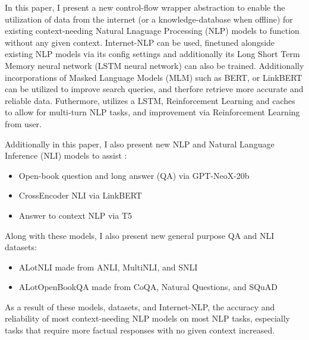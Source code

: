 

In this paper, I present {\bf \inlp} a new control-flow wrapper abstraction to enable the utilization of data from the internet (or a knowledge-database when offline) for existing context-needing Natural Lnaguage Processing (NLP) models to function without any given context. Internet-NLP can be used, finetuned alongside existing NLP models via its config settings and additionally its Long Short Term Memory neural network (LSTM neural network) can also be trained. Additionally incorporations of Masked Language Models (MLM) such as BERT, or LinkBERT \cite{devlin-etal-2019-bert,yasunaga-etal-2022-linkbert} can be utilized to improve search queries, and therfore retrieve more accurate and reliable data. Futhermore, {\bf \inlp} utilizes a LSTM, Reinforcement Learning and caches to allow for multi-turn NLP tasks, and improvement via Reinforcement Learning from user.


Additionally in this paper, I also present new NLP and Natural Language Inference (NLI) models to assist {\bf \inlp}:

\begin{itemize}
    \item Open-book question and long answer (QA) via GPT-NeoX-20b \cite{gpt-neox-library, gpt-neox-20b}
    \item CrossEncoder NLI via LinkBERT \cite{reimers-2019-sentence-bert,thakur-2020-AugSBERT, yasunaga-etal-2022-linkbert}
    \item Answer to context NLP via T5 \cite{https://doi.org/10.48550/arxiv.1910.10683}
\end{itemize}

Along with these models, I also present new general purpose QA and NLI datasets:

\begin{itemize}
    \item ALotNLI made from ANLI, MultiNLI, and SNLI \cite{nie-etal-2020-adversarial,N18-1101,DBLP:journals/corr/BowmanAPM15}
    \item ALotOpenBookQA made from CoQA, Natural Questions, and SQuAD \cite{DBLP:journals/corr/abs-1808-07042,kwiatkowski-etal-2019-natural,DBLP:journals/corr/abs-1806-03822}
\end{itemize}

As a result of these models, datasets, and Internet-NLP, the accuracy and reliability of most context-needing NLP models on most NLP tasks, especially tasks that require more factual responses with no given context increased.

